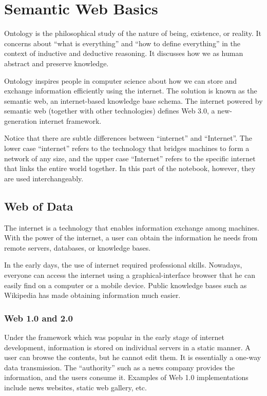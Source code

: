 \chapter{Semantic Web Basics} \label{ch:briefintrosemanticweb}

Ontology is the philosophical study of the nature of being, existence, or reality. It concerns about ``what is everything'' and ``how to define everything'' in the context of inductive and deductive reasoning. It discusses how we as human abstract and preserve knowledge.

Ontology inspires people in computer science about how we can store and exchange information efficiently using the internet. The solution is known as the semantic web, an internet-based knowledge base schema. The internet powered by semantic web (together with other technologies) defines Web 3.0, a new-generation internet framework.

Notice that there are subtle differences between ``internet'' and ``Internet''. The lower case ``internet'' refers to the technology that bridges machines to form a network of any size, and the upper case ``Internet'' refers to the specific internet that links the entire world together. In this part of the notebook, however, they are used interchangeably.

\section{Web of Data}

The internet is a technology that enables information exchange among machines. With the power of the internet, a user can obtain the information he needs from remote servers, databases, or knowledge bases.

In the early days, the use of internet required professional skills. Nowadays, everyone can access the internet using a graphical-interface browser that he can easily find on a computer or a mobile device. Public knowledge bases such as Wikipedia has made obtaining information much easier.

\subsection{Web 1.0 and 2.0}

Under the  framework which was popular in the early stage of internet development, information is stored on individual servers in a static manner. A user can browse the contents, but he cannot edit them. It is essentially a one-way data transmission. The ``authority'' such as a news company provides the information, and the users consume it. Examples of Web 1.0 implementations include news websites, static web gallery, etc.

